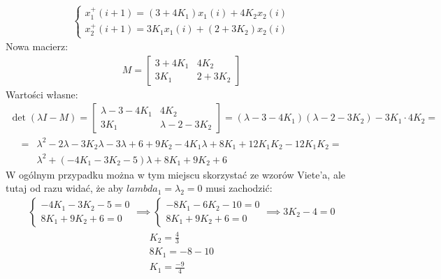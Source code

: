 \documentclass[a4paper,11pt]{article}
\begin{document}
\begin{align*}
\begin{cases}
x_{1}^{+}(i+1) = (3+4K_{1})x_{1}(i) + 4K_{2}x_{2}(i) \\
x_{2}^{+}(i+1) = 3K_{1}x_{1}(i) + (2+3K_{2})x_{2}(i)
\end{cases}
\end{align*}
Nowa macierz:
\begin{align*}
M = 
\begin{bmatrix}
3+4K_{1} & 4K_{2} \\
3K_{1} & 2+3K_{2}
\end{bmatrix}
\end{align*}
Wartości własne:
\begin{align*}
\det(\lambda I - M ) = 
\begin{bmatrix}
\lambda -3-4K_{1} & 4K_{2} \\
3K_{1} & \lambda -2-3K_{2}
\end{bmatrix}
=
( \lambda -3-4K_{1} )( \lambda -2-3K_{2} ) - 3K_{1} \cdot 4K_{2}
= 
\end{align*}
\begin{align*}
=
&\lambda^{2}-2\lambda-3K_{2}\lambda-3\lambda+6+9K_{2}-4K_{1}\lambda+8K_{1}+12K_{1}K_{2}-12K_{1}K_{2}
= \\
&\lambda^{2}+(-4K_{1}-3K_{2}-5 )\lambda+8K_{1}+9K_{2}+6
\end{align*}
W ogólnym przypadku można w tym miejscu skorzystać ze wzorów Viete'a, ale tutaj od razu widać, że aby \( lambda_{1} = \lambda_{2} = 0 \) musi zachodzić: 
\begin{align*}
\begin{cases}
-4K_{1}-3K_{2}-5 = 0 \\
8K_{1}+9K_{2}+6 = 0
\end{cases}
\implies
\begin{cases}
-8K_{1}-6K_{2}-10 = 0 \\
8K_{1}+9K_{2}+6 = 0
\end{cases}
\implies
3K_{2}-4 = 0
\end{align*}
\begin{align*}
K_{2} = \frac{4}{3} \\
8K_{1} = -8 - 10 \\
K_{1} = \frac{-9}{4}
\end{align*}
\end{document}
